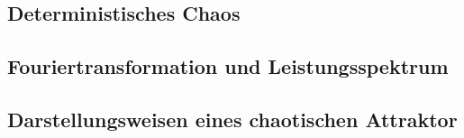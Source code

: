 \subsection{Deterministisches Chaos}
\label{sub:determChaos}

\subsection{Fouriertransformation und Leistungsspektrum}
\label{sub:fouriertrafo}

\subsection{Darstellungsweisen eines chaotischen Attraktor}
\label{sub:darstellungAttraktor}